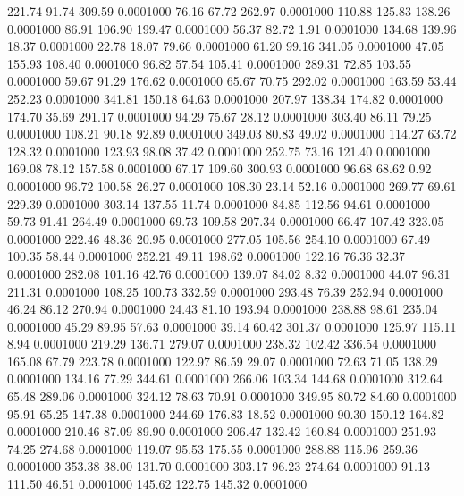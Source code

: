  221.74   91.74  309.59   0.0001000
  76.16   67.72  262.97   0.0001000
 110.88  125.83  138.26   0.0001000
  86.91  106.90  199.47   0.0001000
  56.37   82.72    1.91   0.0001000
 134.68  139.96   18.37   0.0001000
  22.78   18.07   79.66   0.0001000
  61.20   99.16  341.05   0.0001000
  47.05  155.93  108.40   0.0001000
  96.82   57.54  105.41   0.0001000
 289.31   72.85  103.55   0.0001000
  59.67   91.29  176.62   0.0001000
  65.67   70.75  292.02   0.0001000
 163.59   53.44  252.23   0.0001000
 341.81  150.18   64.63   0.0001000
 207.97  138.34  174.82   0.0001000
 174.70   35.69  291.17   0.0001000
  94.29   75.67   28.12   0.0001000
 303.40   86.11   79.25   0.0001000
 108.21   90.18   92.89   0.0001000
 349.03   80.83   49.02   0.0001000
 114.27   63.72  128.32   0.0001000
 123.93   98.08   37.42   0.0001000
 252.75   73.16  121.40   0.0001000
 169.08   78.12  157.58   0.0001000
  67.17  109.60  300.93   0.0001000
  96.68   68.62    0.92   0.0001000
  96.72  100.58   26.27   0.0001000
 108.30   23.14   52.16   0.0001000
 269.77   69.61  229.39   0.0001000
 303.14  137.55   11.74   0.0001000
  84.85  112.56   94.61   0.0001000
  59.73   91.41  264.49   0.0001000
  69.73  109.58  207.34   0.0001000
  66.47  107.42  323.05   0.0001000
 222.46   48.36   20.95   0.0001000
 277.05  105.56  254.10   0.0001000
  67.49  100.35   58.44   0.0001000
 252.21   49.11  198.62   0.0001000
 122.16   76.36   32.37   0.0001000
 282.08  101.16   42.76   0.0001000
 139.07   84.02    8.32   0.0001000
  44.07   96.31  211.31   0.0001000
 108.25  100.73  332.59   0.0001000
 293.48   76.39  252.94   0.0001000
  46.24   86.12  270.94   0.0001000
  24.43   81.10  193.94   0.0001000
 238.88   98.61  235.04   0.0001000
  45.29   89.95   57.63   0.0001000
  39.14   60.42  301.37   0.0001000
 125.97  115.11    8.94   0.0001000
 219.29  136.71  279.07   0.0001000
 238.32  102.42  336.54   0.0001000
 165.08   67.79  223.78   0.0001000
 122.97   86.59   29.07   0.0001000
  72.63   71.05  138.29   0.0001000
 134.16   77.29  344.61   0.0001000
 266.06  103.34  144.68   0.0001000
 312.64   65.48  289.06   0.0001000
 324.12   78.63   70.91   0.0001000
 349.95   80.72   84.60   0.0001000
  95.91   65.25  147.38   0.0001000
 244.69  176.83   18.52   0.0001000
  90.30  150.12  164.82   0.0001000
 210.46   87.09   89.90   0.0001000
 206.47  132.42  160.84   0.0001000
 251.93   74.25  274.68   0.0001000
 119.07   95.53  175.55   0.0001000
 288.88  115.96  259.36   0.0001000
 353.38   38.00  131.70   0.0001000
 303.17   96.23  274.64   0.0001000
  91.13  111.50   46.51   0.0001000
 145.62  122.75  145.32   0.0001000
